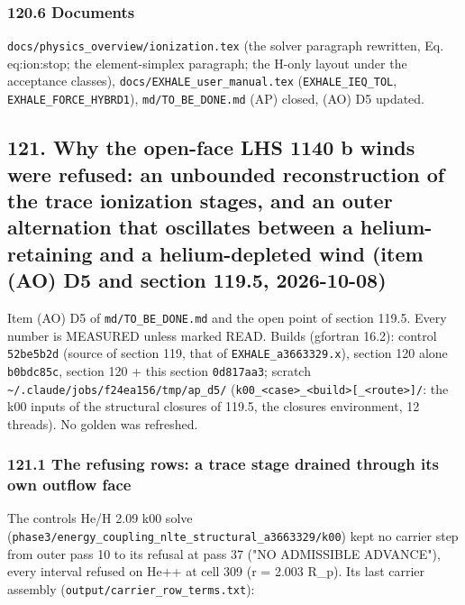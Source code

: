 \documentclass[english,a4paper]{my_memo}
\begin{document}
\subsubsection{120.6 Documents}\label{1206-documents}

\texttt{docs/physics\_overview/ionization.tex} (the solver paragraph rewritten,
Eq. eq:ion:stop; the element-simplex paragraph; the H-only layout under the
acceptance classes), \texttt{docs/EXHALE\_user\_manual.tex}
(\texttt{EXHALE\_IEQ\_TOL}, \texttt{EXHALE\_FORCE\_HYBRD1}), \texttt{md/TO\_BE\_DONE.md} (AP) closed,
(AO) D5 updated.

\subsection{121. Why the open-face LHS 1140 b winds were refused: an unbounded reconstruction of the trace ionization stages, and an outer alternation that oscillates between a helium-retaining and a helium-depleted wind (item (AO) D5 and section 119.5, 2026-10-08)}\label{121-why-the-open-face-lhs-1140-b-winds-were-refused-an-unbounded-reconstruction-of-the-trace-ionization-stages-and-an-outer-alternation-that-oscillates-between-a-helium-retaining-and-a-helium-depleted-wind-item-ao-d5-and-section-1195-2026-10-08}

Item (AO) D5 of \texttt{md/TO\_BE\_DONE.md} and the open point of section 119.5. Every
number is MEASURED unless marked READ. Builds (gfortran 16.2): control
\texttt{52be5b2d} (source of section 119, that of \texttt{EXHALE\_a3663329.x}), section 120
alone \texttt{b0bdc85c}, section 120 + this section \texttt{0d817aa3}; scratch
\texttt{\textasciitilde{}/.claude/jobs/f24ea156/tmp/ap\_d5/} (\texttt{k00\_\textless{}case\textgreater{}\_\textless{}build\textgreater{}{[}\_\textless{}route\textgreater{}{]}/}: the
k00 inputs of the structural closures of 119.5, the closure\textquotesingle s environment,
12 threads). No golden was refreshed.

\subsubsection{121.1 The refusing rows: a trace stage drained through its own outflow face}\label{1211-the-refusing-rows-a-trace-stage-drained-through-its-own-outflow-face}

The control\textquotesingle s He/H 2.09 k00 solve (\texttt{phase3/energy\_coupling\_nlte\_structural\_a3663329/k00})
kept no carrier step from outer pass 10 to its refusal at pass 37 ("NO
ADMISSIBLE ADVANCE"), every interval refused on He++ at cell 309 (r = 2.003
R\_p). Its last carrier assembly (\texttt{output/carrier\_row\_terms.txt}):
\end{document}
